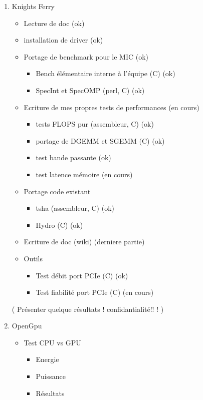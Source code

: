\documentclass{article}
\begin{document}
			\begin{enumerate}
			\item Knights Ferry
				\begin{itemize}
				\item Lecture de doc (ok)
				\item installation de driver (ok)
				\item Portage de benchmark pour le MIC (ok)
					\begin{itemize}
					\item Bench élémentaire interne à l'équipe (C) (ok)
					\item SpecInt et SpecOMP (perl, C) (ok)
					\end{itemize}
				\item Ecriture de mes propres tests de performances (en cours)
					\begin{itemize}
					\item tests FLOPS pur (assembleur, C) (ok)
					\item portage de DGEMM et SGEMM (C) (ok)
					\item test bande passante (ok)
					\item test latence mémoire (en cours)
					\end{itemize}
				\item Portage code existant
					\begin{itemize}
					\item tsha (assembleur, C) (ok)
					\item Hydro (C) (ok)
					\end{itemize}
				\item Ecriture de doc (wiki) (derniere partie)
				\item Outils
					\begin{itemize}
					\item Test débit port PCIe (C) (ok)
					\item Test fiabilité port PCIe (C) (en cours)
					\end{itemize}
				\end{itemize}
				( Présenter quelque résultats ! confidantialité!! ! )
			\item OpenGpu
				\begin{itemize}
				\item Test CPU vs GPU
					\begin{itemize}
					\item Energie
					\item Puissance
					\item Résultats
					\end{itemize}

\end{itemize}
\end{enumerate}
\end{document}
